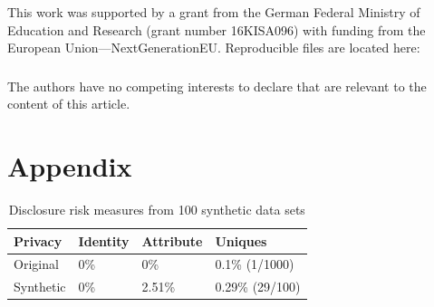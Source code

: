 \documentclass[runningheads]{llncs}
\begin{document}
\begin{credits}
\subsubsection{\ackname} This work was supported by a grant from the German Federal Ministry of Education and Research (grant number 16KISA096) with funding from the European Union—NextGenerationEU.  Reproducible files are located here: 

\subsubsection{\discintname}
The authors have no competing interests to declare that are relevant to the content of this article.
\end{credits}





\section{Appendix}\label{appendix}
\setcounter{figure}{0}    
\setcounter{table}{0}    
\renewcommand*\thetable{\Alph{section}.\arabic{table}}
\renewcommand*\thefigure{\Alph{section}.\arabic{figure}}
\renewcommand{\theHfigure}{\Alph{section}.\arabic{table}}
\renewcommand{\theHtable}{\Alph{section}.\arabic{figure}}

\begin{table}[]
    \centering
    \caption{Disclosure risk measures from 100 synthetic data sets}
    \begin{tabular}{llll}
        \toprule
        Privacy   & Identity & Attribute & Uniques \\ \midrule
        Original  & 0\%      & 0\%       & 0.1\% (1/1000) \\
        Synthetic & 0\%      & 2.51\%       & 0.29\% (29/100)  \\ 
        \bottomrule
    \end{tabular}
    \label{table:disclosure_risk_100}
\end{table}
\end{document}
